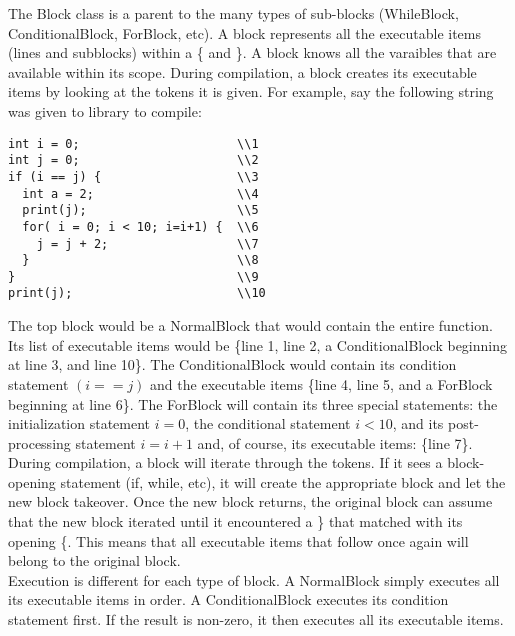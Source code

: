 \documentclass{article}
\begin{document}
\noindent
The Block class is a parent to the many types of sub-blocks (WhileBlock,
ConditionalBlock, ForBlock, etc). A block represents all the executable
items (lines and subblocks) within a \{ and \}. A block knows all the
varaibles that are available within its scope. During compilation, a block
creates its executable items by looking at the tokens it is given. For
example, say the following string was given to library to compile:
{\ttfamily \begin{verbatim}
int i = 0;                      \\1
int j = 0;                      \\2
if (i == j) {                   \\3
  int a = 2;                    \\4
  print(j);                     \\5
  for( i = 0; i < 10; i=i+1) {  \\6
    j = j + 2;                  \\7
  }                             \\8
}                               \\9
print(j);                       \\10
\end{verbatim} }
\noindent
The top block would be a NormalBlock that would contain the entire function.
Its list of executable items would be \{line 1, line 2, a ConditionalBlock
beginning at line 3, and line 10\}. The ConditionalBlock would contain its
condition statement $(i == j)$ and the executable items \{line 4, line 5,
and a ForBlock beginning at line 6\}. The ForBlock will contain its three
special statements: the initialization statement $i = 0$, the conditional
statement $i < 10$, and its post-processing statement $i=i+1$ and, of course,
its executable items: \{line 7\}. \\

\noindent
During compilation, a block will iterate through the tokens. If it sees a
block-opening statement (if, while, etc), it will create the appropriate
block and let the new block takeover. Once the new block returns, the original
block can assume that the new block iterated until it encountered a \} that
matched with its opening \{. This means that all executable items that follow
once again will belong to the original block. \\

\noindent
Execution is different for each type of block. A NormalBlock simply executes
all its executable items in order. A ConditionalBlock executes its condition
statement first. If the result is non-zero, it then executes all its executable
items. \\
\end{document}
